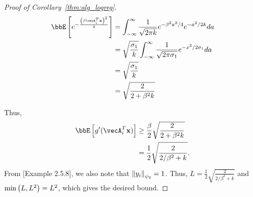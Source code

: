 \begin{proof}[Proof of Corollary~\ref{thm:alg_logreg}]
\begin{align}
\bbE\insq{e^{-\frac{\inp{\beta\vecA_i^T\bx}^2}{4}}} &= \int_{-\infty}^{\infty}\frac{1}{\sqrt{2\pi k}}e^{-\beta^2a^2/4}e^{-a^2/2k} da\nonumber\\
& = \sqrt{\frac{\sigma_1}{k}}\int_{-\infty}^{\infty}\frac{1}{\sqrt{2\pi \sigma_1}}e^{-x^2/2\sigma_1} da\nonumber\\
& = \sqrt{\frac{\sigma_1}{k}}\nonumber\\
& = \sqrt{\frac{2}{2+\beta^2 k}}\label{eq:expectation_log}
\end{align}

Thus,
\begin{align*}
\bbE\insq{g'(\vecA_i^T\bx)}&\geq \frac{\beta}{2}\sqrt{\frac{2}{2+\beta^2 k}}\\
& = \frac{1}{2}\sqrt{\frac{2}{2/\beta^2+ k}}.
\end{align*}
From [Example 2.5.8]\cite{vershynin}, we also note that $\left\lVert{y_i}\right\rVert_{\psi_2} = 1$. Thus, $L = \frac{1}{2}\sqrt{\frac{2}{2/\beta^2+ k}}$ and $\min\left(L, L^2\right) = L^2$, which gives the desired bound.

\end{proof}


